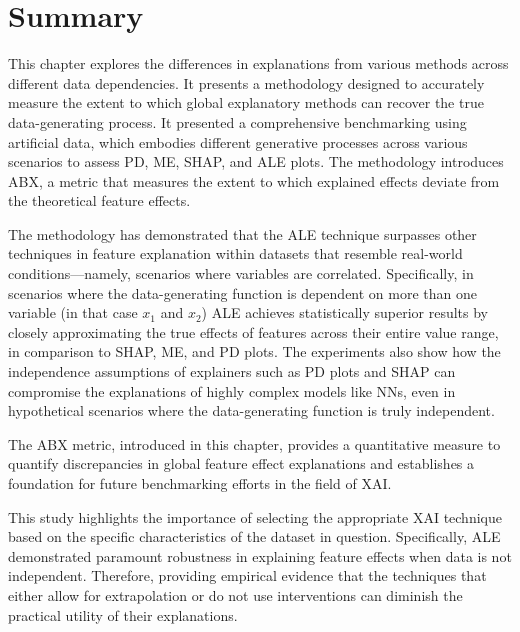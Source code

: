 \section{Summary}

This chapter explores the differences in explanations from various methods across different data dependencies. It presents a methodology designed to accurately measure the extent to which global explanatory methods can recover the true data-generating process. It presented a comprehensive benchmarking using artificial data, which embodies different generative processes across various scenarios to assess \gls{PD}, \gls{ME}, \gls{SHAP}, and \gls{ALE} plots. The methodology introduces \gls{ABX}, a metric that measures the extent to which explained effects deviate from the theoretical feature effects.

The methodology has demonstrated that the \gls{ALE} technique surpasses other techniques in feature explanation within datasets that resemble real-world conditions—namely, scenarios where variables are correlated. Specifically, in scenarios where the data-generating function is dependent on more than one variable (in that case \(x_1\) and \(x_2\)) ALE achieves statistically superior results by closely approximating the true effects of features across their entire value range, in comparison to \gls{SHAP}, \gls{ME}, and \gls{PD} plots. The experiments also show how the independence assumptions of explainers such as \gls{PD} plots and SHAP can compromise the explanations of highly complex models like \gls{NN}s, even in hypothetical scenarios where the data-generating function is truly independent.

The \gls{ABX} metric, introduced in this chapter, provides a quantitative measure to quantify discrepancies in global feature effect explanations and establishes a foundation for future benchmarking efforts in the field of \gls{XAI}.

This study highlights the importance of selecting the appropriate \gls{XAI} technique based on the specific characteristics of the dataset in question. Specifically, \gls{ALE} demonstrated paramount robustness in explaining feature effects when data is not independent. Therefore, providing empirical evidence that the techniques that either allow for extrapolation or do not use interventions can diminish the practical utility of their explanations. 


